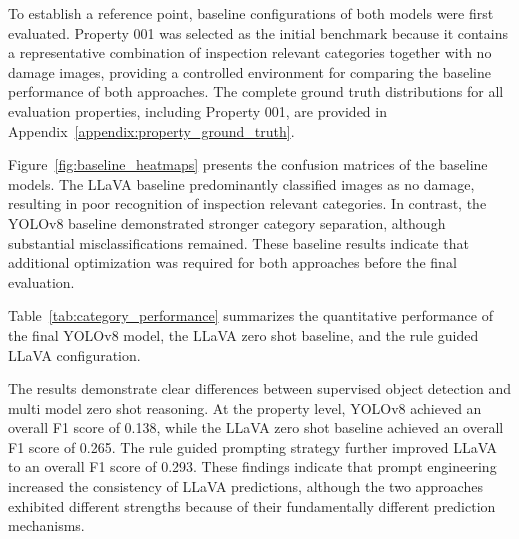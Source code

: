 To establish a reference point, baseline configurations of both models were first evaluated. Property 001 was selected as the initial benchmark because it contains a representative combination of inspection relevant categories together with no damage images, providing a controlled environment for comparing the baseline performance of both approaches. The complete ground truth distributions for all evaluation properties, including Property 001, are provided in Appendix~\ref{appendix:property_ground_truth}.

Figure~\ref{fig:baseline_heatmaps} presents the confusion matrices of the baseline models. The LLaVA baseline predominantly classified images as no damage, resulting in poor recognition of inspection relevant categories. In contrast, the YOLOv8 baseline demonstrated stronger category separation, although substantial misclassifications remained. These baseline results indicate that additional optimization was required for both approaches before the final evaluation.

Table~\ref{tab:category_performance} summarizes the quantitative performance of the final YOLOv8 model, the LLaVA zero shot baseline, and the rule guided LLaVA configuration.

The results demonstrate clear differences between supervised object detection and multi model zero shot reasoning. At the property level, YOLOv8 achieved an overall F1 score of 0.138, while the LLaVA zero shot baseline achieved an overall F1 score of 0.265. The rule guided prompting strategy further improved LLaVA to an overall F1 score of 0.293. These findings indicate that prompt engineering increased the consistency of LLaVA predictions, although the two approaches exhibited different strengths because of their fundamentally different prediction mechanisms.


